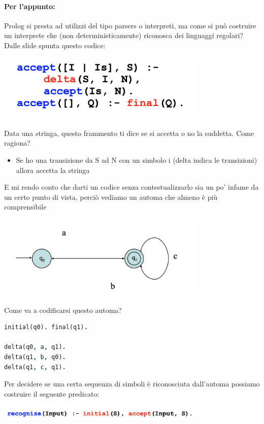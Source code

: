 \documentclass[12pt, a4paper, openany, oneside]{book}
\begin{document}
\paragraph{Per l'appunto: }Prolog si presta ad utilizzi del tipo parsers o 
interpreti, ma come si può costruire un interprete che (non deterministicamente)
riconosca dei linguaggi regolari? Dalle slide spunta questo codice:
\begin{center}
\includegraphics[width=0.75\textwidth]{accept}
\end{center}
Data una stringa, questo frammento ti dice se si accetta o no la suddetta. Come
ragiona? 
\begin{itemize}
	\item Se ho una transizione da S ad N con un simbolo i (delta indica le
	transizioni) allora accetta la stringa
\end{itemize}
E mi rendo conto che darti un codice senza contestualizzarlo sia un po' infame
da un certo punto di vista, perciò vediamo un automa che almeno è più 
comprensibile
\begin{center}
\includegraphics[width=0.75\textwidth]{autom}
\end{center}      
Come va a codificarsi questo automa?
\begin{lstlisting}[language=Prolog]
initial(q0). final(q1).

delta(q0, a, q1). 
delta(q1, b, q0). 
delta(q1, c, q1).
\end{lstlisting}
Per decidere se una certa sequenza di simboli è riconosciuta dall’automa 
possiamo costruire il seguente predicato:
\begin{center}
\includegraphics[width=0.75\textwidth]{reco}
\end{center}
\end{document}
